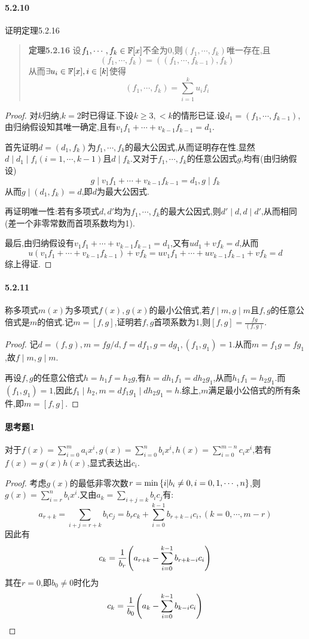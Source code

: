 \documentclass[11pt]{article}
\begin{document}
\paragraph{5.2.10}证明定理5.2.16
\begin{quotation}
    \textbf{定理5.2.16} 设$f_1,\cdots,f_k\in \mathbb{F}[x]$不全为0,则$(f_1,\cdots,f_k)$唯一存在,且
    $$(f_1,\cdots,f_k)=((f_1,\cdots,f_{k-1}),f_k)$$
    从而$\exists u_i\in \mathbb{F}[x], i\in [k]$使得
    $$(f_1,\cdots,f_k)=\sum_{i=1}^k u_i f_i$$
\end{quotation}
\begin{proof}
    对$k$归纳,$k=2$时已得证.下设$k\geq 3, <k$的情形已证.设$d_1=(f_1,\cdots,f_{k-1})$,由归纳假设知其唯一确定,且有$v_1f_1+\cdots+v_{k-1}f_{k-1}=d_1$.
    
    首先证明$d=(d_1,f_k)$为$f_1,\cdots,f_k$的最大公因式,从而证明存在性.显然$d\mid d_1\mid f_i (i=1,\cdots,k-1)$且$d\mid f_k$.又对于$f_1,\cdots,f_k$的任意公因式$g$,均有(由归纳假设)
    $$g\mid v_1f_1+\cdots+v_{k-1}f_{k-1}=d_1, g\mid f_k$$
    从而$g\mid (d_1,f_k)=d$,即$d$为最大公因式.

    再证明唯一性:若有多项式$d,d'$均为$f_1,\cdots,f_k$的最大公因式,则$d'\mid d, d\mid d'$,从而相同(差一个非零常数而首项系数均为1).

    最后,由归纳假设有$v_1f_1+\cdots+v_{k-1}f_{k-1}=d_1$,又有$ud_1+vf_k=d$,从而
    $$u(v_1f_1+\cdots+v_{k-1}f_{k-1})+vf_k=uv_1f_1+\cdots+uv_{k-1}f_{k-1}+vf_k=d$$
    综上得证.
\end{proof}
\paragraph{5.2.11}称多项式$m(x)$为多项式$f(x),g(x)$的最小公倍式,若$f\mid m, g\mid m$且$f,g$的任意公倍式是$m$的倍式.记$m=[f,g]$,证明若$f,g$首项系数为1,则$[f,g]=\frac{fg}{(f,g)}$.
\begin{proof}
    记$d=(f,g), m=fg/d, f=df_1, g=dg_1, (f_1,g_1)=1$.从而$m=f_1g=fg_1$,故$f\mid m, g\mid m$.
    
    再设$f,g$的任意公倍式$h=h_1f=h_2g$,有$h=dh_1f_1=dh_2g_1$,从而$h_1f_1=h_2g_1$.而$(f_1,g_1)=1$,因此$f_1\mid h_2, m=df_1g_1\mid dh_2g_1=h$.综上,$m$满足最小公倍式的所有条件,即$m=[f,g]$.
\end{proof}

\paragraph{思考题1}对于$f(x)=\sum_{i=0}^{m}a_ix^i, g(x)=\sum_{i=0}^{n}b_ix^i, h(x)=\sum_{i=0}^{m-n}c_ix^i$,若有$f(x)=g(x)h(x)$,显式表达出$c_i$.
\begin{proof}
    考虑$g(x)$的最低非零次数$r=\min\left\{i|b_i\neq 0, i=0,1,\cdots,n\right\}$,则$g(x)=\sum_{i=r}^{n}b_ix^i$.又由$a_k=\sum_{i+j=k}b_ic_j$有:
    $$a_{r+k}=\sum_{i+j=r+k}b_ic_j=b_rc_k+\sum_{i=0}^{k-1}b_{r+k-i}c_i, (k=0,\cdots,m-r)$$
    因此有
    $$c_k=\frac{1}{b_r}\!\left(a_{r+k}-\sum_{i=0}^{k-1}b_{r+k-i}c_i\right)$$
    其在$r=0$,即$b_0\neq 0$时化为
    $$c_k=\frac{1}{b_0}\!\left(a_{k}-\sum_{i=0}^{k-1}b_{k-i}c_i\right)$$
\end{proof}
\end{document}
